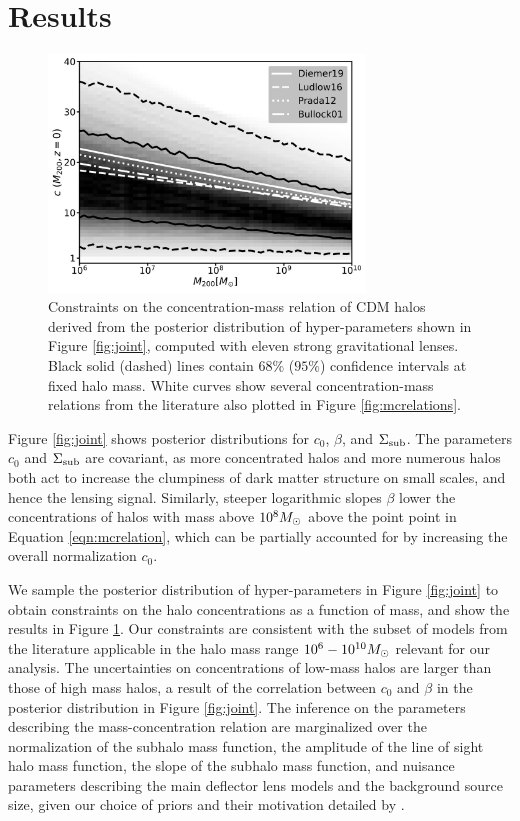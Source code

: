 \section{Results}
\label{sec:results}
\begin{figure}
	\centering
	\includegraphics[clip,trim=0cm 0cm 0cm
	0cm,width=0.75\textwidth,keepaspectratio]{./figures_mcrelation/mc_summary.pdf}
	\caption[Constraints on the concentration of halos as a function of halo mass]{\label{fig:mcphys} Constraints on the concentration-mass relation of CDM halos derived from the posterior distribution of hyper-parameters shown in Figure \ref{fig:joint}, computed with eleven strong gravitational lenses. Black solid (dashed) lines contain $68\%$ ($95\%$) confidence intervals at fixed halo mass. White curves show several concentration-mass relations from the literature also plotted in Figure \ref{fig:mcrelations}.}
\end{figure}	
Figure \ref{fig:joint} shows posterior distributions for $c_0$, $\beta$, and $\Sigma_{\rm{sub}}$. The parameters $c_0$ and $\Sigma_{\rm{sub}}$ are covariant, as more concentrated halos and more numerous halos both act to increase the clumpiness of dark matter structure on small scales, and hence the lensing signal. Similarly, steeper logarithmic slopes $\beta$ lower the concentrations of halos with mass above $10^8 {M_{\odot}}$ above the point point in Equation \ref{eqn:mcrelation}, which can be partially accounted for by increasing the overall normalization $c_0$.

We sample the posterior distribution of hyper-parameters in Figure \ref{fig:joint} to obtain constraints on the halo concentrations as a function of mass, and show the results in Figure \ref{fig:mcphys}. Our constraints are consistent with the subset of models from the literature applicable in the halo mass range $10^6 - 10^{10} {M_{\odot}}$ relevant for our analysis. The uncertainties on concentrations of low-mass halos are larger than those of high mass halos, a result of the correlation between $c_0$ and $\beta$ in the posterior distribution in Figure \ref{fig:joint}. The inference on the parameters describing the mass-concentration relation are marginalized over the normalization of the subhalo mass function, the amplitude of the line of sight halo mass function, the slope of the subhalo mass function, and nuisance parameters describing the main deflector lens models and the background source size, given our choice of priors and their motivation detailed by \citet{Gilman++19b}. 

